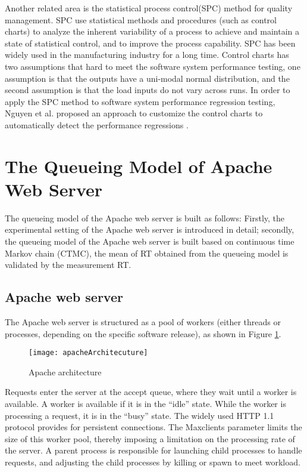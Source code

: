 \documentclass[10pt,journal,letterpaper,compsoc]{IEEEtran}
\begin{document}
Another related area is the statistical process control(SPC) method for quality 
management. SPC use statistical methods and procedures (such as control charts)
to analyze the inherent variability of a process to achieve and maintain a state 
of statistical control, and to improve the process capability.
SPC has been widely used in the manufacturing industry for a long time.
Control charts has two assumptions that hard to meet the software system performance
testing, one assumption is 
that the outputs have a uni-modal normal distribution,
and the second assumption is that the load inputs do not vary across runs.
In order to apply the SPC method to software system 
performance regression testing, Nguyen et al. 
proposed an approach to customize the control charts to automatically detect the 
performance regressions \cite{ChScience:THDNguyen2012ACM}.

\section{The Queueing Model of Apache Web Server} %
\label{sec:queueingModel}
The queueing model of the Apache web server is built as follows:
Firstly, the experimental setting of the Apache web server is introduced
in detail;
secondly, the queueing model of the Apache web server is built based
on continuous time Markov chain (CTMC),
the mean of RT obtained from the queueing model is validated by
the measurement RT.

\subsection{Apache web server} %
\label{subsec:apacheWebServer}
The Apache web server is structured as a pool of workers
(either threads or processes, depending on the specific software release),
as shown in Figure \ref{fig:apacheArch}.

\begin{figure}[htb]
\centering
\texttt{[image: apacheArchitecuture]}
\caption{Apache architecture}
\label{fig:apacheArch}
\end{figure}

Requests enter the server at the accept queue,
where they wait until a worker is available.
A worker is available if it is in the ``idle'' state.
While the worker is processing a request, it is in the ``busy'' state.
The widely used HTTP 1.1 protocol provides for persistent connections.
The Maxclients parameter limits the size of this worker pool,
thereby imposing a limitation on the processing rate of the server.
A parent process is responsible for launching child processes to
handle requests, and adjusting the child processes by killing
or spawn to meet workload.
\end{document}
